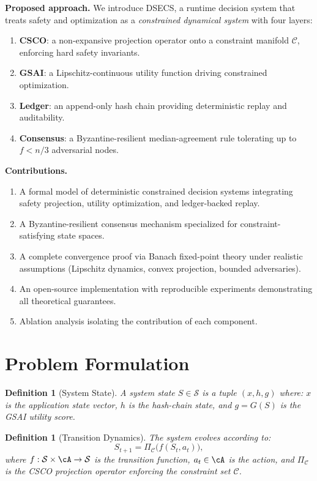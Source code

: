 \documentclass[11pt,letterpaper]{article}
\newtheorem{definition}[theorem]{Definition}
\newcommand{\cC}{\mathcal{C}}
\newcommand{\cS}{\mathcal{S}}
\begin{document}
\noindent\textbf{Proposed approach.}
We introduce DSECS, a runtime decision system that treats safety and
optimization as a \emph{constrained dynamical system} with four layers:
\begin{enumerate}[nosep]
    \item \textbf{CSCO}: a non-expansive projection operator onto a
    constraint manifold $\cC$, enforcing hard safety invariants.
    \item \textbf{GSAI}: a Lipschitz-continuous utility function driving
    constrained optimization.
    \item \textbf{Ledger}: an append-only hash chain providing deterministic
    replay and auditability.
    \item \textbf{Consensus}: a Byzantine-resilient median-agreement rule
    tolerating up to $f < n/3$ adversarial nodes.
\end{enumerate}

\noindent\textbf{Contributions.}
\begin{enumerate}[nosep]
    \item A formal model of deterministic constrained decision systems
    integrating safety projection, utility optimization, and ledger-backed
    replay.
    \item A Byzantine-resilient consensus mechanism specialized for
    constraint-satisfying state spaces.
    \item A complete convergence proof via Banach fixed-point theory under
    realistic assumptions (Lipschitz dynamics, convex projection, bounded
    adversaries).
    \item An open-source implementation with reproducible experiments
    demonstrating all theoretical guarantees.
    \item Ablation analysis isolating the contribution of each component.
\end{enumerate}

\section{Problem Formulation}

\begin{definition}[System State]
A system state $S \in \cS$ is a tuple $(x, h, g)$ where:
$x$ is the application state vector, $h$ is the hash-chain state,
and $g = G(S)$ is the GSAI utility score.
\end{definition}

\begin{definition}[Transition Dynamics]
The system evolves according to:
\begin{equation}
    S_{t+1} = \Pi_{\cC}\bigl(f(S_t, a_t)\bigr),
    \label{eq:dynamics}
\end{equation}
where $f: \cS \times \cA \to \cS$ is the transition function,
$a_t \in \cA$ is the action, and $\Pi_{\cC}$ is the CSCO projection
operator enforcing the constraint set $\cC$.
\end{definition}
\end{document}
